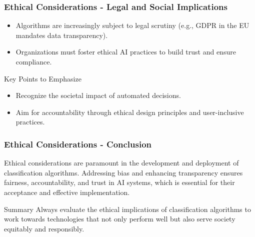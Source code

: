 \documentclass{beamer}
\begin{document}
\begin{frame}[fragile]
    \frametitle{Ethical Considerations - Legal and Social Implications}
    \begin{itemize}
        \item Algorithms are increasingly subject to legal scrutiny (e.g., GDPR in the EU mandates data transparency).
        \item Organizations must foster ethical AI practices to build trust and ensure compliance.
    \end{itemize}

    \begin{block}{Key Points to Emphasize}
        \begin{itemize}
            \item Recognize the societal impact of automated decisions.
            \item Aim for accountability through ethical design principles and user-inclusive practices.
        \end{itemize}
    \end{block}
\end{frame}

\begin{frame}[fragile]
    \frametitle{Ethical Considerations - Conclusion}
    Ethical considerations are paramount in the development and deployment of classification algorithms. 
    Addressing bias and enhancing transparency ensures fairness, accountability, and trust in AI systems, which is essential for their acceptance and effective implementation.
    \begin{block}{Summary}
        Always evaluate the ethical implications of classification algorithms to work towards technologies that not only perform well but also serve society equitably and responsibly.
    \end{block}
\end{frame}
\end{document}
